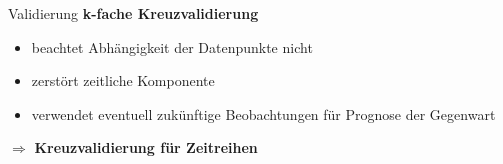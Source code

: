 \begin{frame}{Validierung}
	\textbf{k-fache Kreuzvalidierung}
	\begin{itemize}
		\item beachtet Abhängigkeit der Datenpunkte nicht
		\item zerstört zeitliche Komponente
		\item verwendet eventuell zukünftige Beobachtungen für Prognose der Gegenwart
	\end{itemize}
	$\Rightarrow$ \textbf{Kreuzvalidierung für Zeitreihen}
\end{frame}
	
	


